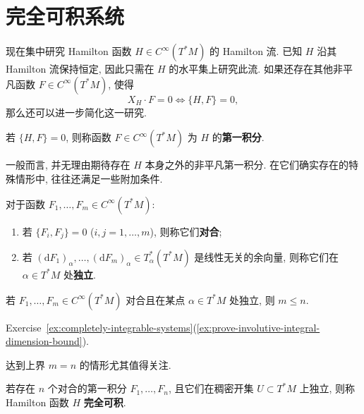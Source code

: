 \section{完全可积系统}\label{sec:completely-integrable-systems}

现在集中研究 Hamilton 函数 $H\in C^\infty(T^*M)$ 的 Hamilton 流. 已知 $H$ 沿其 Hamilton 流保持恒定, 因此只需在 $H$ 的水平集上研究此流. 如果还存在其他非平凡函数 $F\in C^\infty(T^*M)$, 使得
\[
  X_H\cdot F=0\iff\{H,F\}=0,
\]
那么还可以进一步简化这一研究.

\begin{RiemannDefinition}\label{def:first-integral-of-hamiltonian}
若 $\{H,F\}=0$, 则称函数 $F\in C^\infty(T^*M)$ 为 $H$ 的\textbf{第一积分}.
\end{RiemannDefinition}

一般而言, 并无理由期待存在 $H$ 本身之外的非平凡第一积分. 在它们确实存在的特殊情形中, 往往还满足一些附加条件.

\begin{RiemannDefinition}\label{def:involution-and-independent-integrals}
对于函数 $F_1,\ldots,F_m\in C^\infty(T^*M)$:
\begin{enumerate}[label=(\roman*),leftmargin=*]
\item 若 $\{F_i,F_j\}=0$ ($i,j=1,\ldots,m$), 则称它们\textbf{对合};
\item 若 $(\mathrm{d}F_1)_\alpha,\ldots,(\mathrm{d}F_m)_\alpha\in T_\alpha^*(T^*M)$ 是线性无关的余向量, 则称它们在 $\alpha\in T^*M$ 处\textbf{独立}.
\end{enumerate}
\end{RiemannDefinition}

\begin{RiemannProposition}\label{prop:dimension-bound-for-independent-integrals-in-involution}
若 $F_1,\ldots,F_m\in C^\infty(T^*M)$ 对合且在某点 $\alpha\in T^*M$ 处独立, 则 $m\leq n$.
\end{RiemannProposition}

\begin{RiemannProof}
Exercise~\ref{ex:completely-integrable-systems}(\ref{ex:prove-involutive-integral-dimension-bound}).
\end{RiemannProof}

达到上界 $m=n$ 的情形尤其值得关注.

\begin{RiemannDefinition}\label{def:completely-integrable-hamiltonian}
若存在 $n$ 个对合的第一积分 $F_1,\ldots,F_n$, 且它们在稠密开集 $U\subset T^*M$ 上独立, 则称 Hamilton 函数 $H$ \textbf{完全可积}.
\end{RiemannDefinition}

